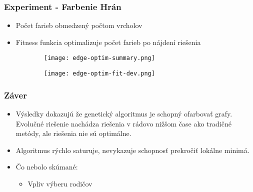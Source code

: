 \begin{frame}
	\frametitle{Experiment - Farbenie Hrán}
	\begin{itemize}
		\item Počet farieb obmedzený počtom vrcholov
		\item Fitness funkcia optimalizuje počet farieb po nájdení riešenia
	\end{itemize}
	\begin{table}
		\caption{Agregované výsledky 100 behov na grafe \emph{1-FullIns3}\footnote{Link to Graph}}
	\end{table}
	
	\begin{figure}
		\begin{subfigure}{.5\textwidth}
			\texttt{[image: edge-optim-summary.png]}
		\end{subfigure}%
		\begin{subfigure}{.5\textwidth}
			\texttt{[image: edge-optim-fit-dev.png]}
		\end{subfigure}
		
	\end{figure}
\end{frame}

\begin{frame}
	\frametitle{Záver}
	\begin{itemize}
		\item Výsledky dokazujú že genetický algoritmus je schopný ofarbovať grafy. Evolučné riešenie nachádza riešenia v rádovo nižšom čase ako tradičné metódy, ale riešenia nie sú optimálne.
		\item Algoritmus rýchlo saturuje, nevykazuje schopnosť prekročiť lokálne minimá.
		\item Čo nebolo skúmané:
		\begin{itemize}
			\item Vpliv výberu rodičov
		\end{itemize}
	\end{itemize}
	
\end{frame}

